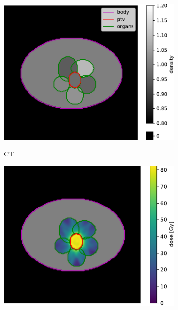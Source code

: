 \begin{figure}
	\centering
	\begin{subfigure}{0.48\linewidth}
		\centering
		\includegraphics[width=\linewidth]{AIME/main_slice-ct.pdf}
		\label{fig:main_slice-ct}
		\caption{CT}
	\end{subfigure}
	\hfill
	\begin{subfigure}{0.48\linewidth}
		\centering
		\includegraphics[width=\linewidth]{AIME/main_slice-dose.pdf}
		\label{fig:main_slice-dose}

\end{subfigure}
\end{figure}
